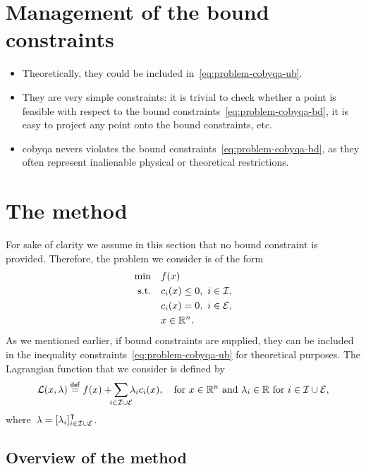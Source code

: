 \section{Management of the bound constraints}

\begin{itemize}
    \item Theoretically, they could be included in~\cref{eq:problem-cobyqa-ub}.
    \item They are very simple constraints: it is trivial to check whether a point is feasible with respect to the bound constraints~\cref{eq:problem-cobyqa-bd}, it is easy to project any point onto the bound constraints, etc.
    \item \gls{cobyqa} nevers violates the bound constraints~\cref{eq:problem-cobyqa-bd}, as they often represent inalienable physical or theoretical restrictions.
\end{itemize}

\section{The  method}

For sake of clarity we assume in this section that no bound constraint is provided.
Therefore, the problem we consider is of the form
\begin{subequations}
    \label{eq:problem-cobyqa-no-bounds}
    \begin{align}
        \min        & \quad f(x)\\
        \text{s.t.} & \quad c_{i}(x) \le 0, ~ i \in \mathcal{I},\\
                    & \quad c_{i}(x) = 0, ~ i \in \mathcal{E},\\
                    & \quad x \in \mathbb{R}^n. \nonumber
    \end{align}
\end{subequations}
As we mentioned earlier, if bound constraints are supplied, they can be included in the inequality constraints~\cref{eq:problem-cobyqa-ub} for theoretical purposes.
The Lagrangian function that we consider is defined by
\begin{equation*}
    \lag(x, \lambda) \eqdef \obj(x) + \sum_{\mathclap{i \in \iub \cup \ieq}} \lambda_i \con{i}(x), \quad \text{for~$x \in \R^n$ and~$\lambda_i \in \R$ for~$i \in \iub \cup \ieq$},
\end{equation*}
where~$\lambda = [\lambda_i]_{i \in \mathcal{I} \cup \mathcal{E}}^{\mathsf{T}}$.

\subsection{Overview of the method}

